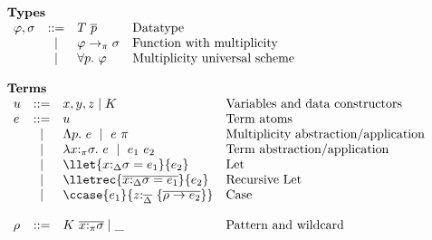 
\begin{figure}[h]
\begin{framed}
\[
\begin{array}{l}
%
\textbf{Types} \\
\begin{array}{lcll}
    \varphi,\sigma  & ::=  & T~\overline{p}         & \textrm{Datatype} \\
                    & \mid & \varphi \to_\pi \sigma & \textrm{Function with multiplicity}\\
                    & \mid & \forall p.~\varphi     & \textrm{Multiplicity universal scheme}\\
\end{array}\\\\
%
\textbf{Terms}\\
\begin{array}{lcll}
    u                & ::=  & x,y,z \mid K                                                     & \textrm{Variables and data constructors}\\
    e                & ::=  & u                                                                & \textrm{Term atoms}\\
                     & \mid & \Lambda p.~e~\mid~e~\pi                                          & \textrm{Multiplicity abstraction/application}\\
                     & \mid & \lambda x{:}_\pi\sigma.~e~\mid~e_1~e_2                           & \textrm{Term abstraction/application}\\
                     & \mid & \llet{x{:}_\Delta\sigma = e_1}{e_2}                              & \textrm{Let} \\
                     & \mid & \lletrec{\overline{x{:}_\Delta\sigma = e_1}}{e_2}                & \textrm{Recursive Let} \\
                     & \mid & \ccase{e_1}{z{:}_{\overline{\Delta}}~\{\overline{\rho\to e_2}\}} & \textrm{Case} \\
                     &      &                                                                  & \\
    \rho             & ::=  & K~\overline{x{:}_\pi\sigma} \mid \_                              & \textrm{Pattern and wildcard} \\

\end{array}
\end{array}\]
\end{framed}
\end{figure}
